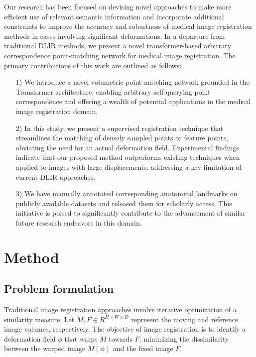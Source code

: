 \documentclass[preprint,review,12pt]{elsarticle}
\begin{document}
Our research has been focused on devising novel approaches to make more efficient use of relevant semantic information and incorporate additional constraints to improve the accuracy and robustness of medical image registration methods in cases involving significant deformations. In a departure from traditional DLIR methods, we present a novel transformer-based arbitrary correspondence point-matching network for medical image registration. The primary contributions of this work are outlined as follows:
\begin{itemize}
\item [1)]
We introduce a novel volumetric point-matching network grounded in the Transformer architecture, enabling arbitrary self-querying point correspondence and offering a wealth of potential applications in the medical image registration domain.
\item [2)]
In this study, we present a supervised registration technique that streamlines the matching of densely sampled points or feature points, obviating the need for an actual deformation field. Experimental findings indicate that our proposed method outperforms existing techniques when applied to images with large displacements, addressing a key limitation of current DLIR approaches.
\item [3)]
We have manually annotated corresponding anatomical landmarks on publicly available datasets and released them for scholarly access. This initiative is poised to significantly contribute to the advancement of similar future research endeavors in this domain.
\end{itemize}



\section{Method}
\subsection{Problem formulation}
Traditional image registration approaches involve iterative optimization of a similarity measure. Let $M, F \in R^{H \times W \times D}$ represent the moving and reference image volumes, respectively. The objective of image registration is to identify a deformation field $\phi$ that warps $M$ towards $F$, minimizing the dissimilarity between the warped image $M(\phi)$ and the fixed image $F$.
\end{document}
